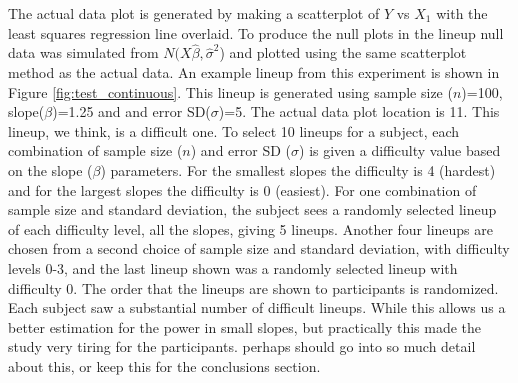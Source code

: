 \documentclass{article}
\newcommand{\green}[1]{{\color{green} #1}} %
\newcommand{\hh}[1]{{\color{orange} #1}} %
\begin{document}
The actual data plot is generated by making a scatterplot of $Y$ vs $X_1$ with the least squares regression line overlaid. To produce the null plots in the lineup null data was simulated from $N(X \hat{\beta}, {\hat{\sigma}}^2$) and plotted using the same scatterplot method as the actual data. 
An example lineup from this experiment is shown in Figure \ref{fig:test_continuous}.  This lineup is generated using sample size ($n$)=100, slope($\beta$)=1.25 and and error SD($\sigma$)=5. The actual data plot location is 11. This lineup, we think, is a difficult one. To select 10 lineups for a subject, each combination of sample size ($n$) and error SD ($\sigma$) is given a difficulty value based on the slope ($\beta$) parameters. For the smallest slopes the difficulty is 4 (hardest) and for the largest slopes the difficulty is 0 (easiest). For one combination of sample size and standard deviation, the subject sees a randomly selected lineup of each difficulty level, all the slopes, giving 5 lineups. Another four lineups are chosen from a second choice of sample size and standard deviation, with difficulty levels 0-3, and the last lineup shown was a randomly selected lineup with difficulty 0. The order that the lineups are shown to participants is randomized. Each subject saw a substantial number of difficult lineups. \hh{While this allows us a better estimation for the power in small slopes, }
but practically this made the study very tiring for the participants. %
\green{perhaps should go into so much detail about this, or keep this for the conclusions section.}  

\end{document}
